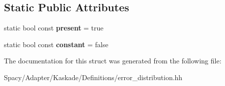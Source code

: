 \subsection*{Static Public Attributes}
\begin{DoxyCompactItemize}
\item 
\hypertarget{structSpacy_1_1Kaskade_1_1ErrorDistribution_1_1D1_ae12f3e44e152e93d2855a893a436472f}{}static bool const {\bfseries present} = true\label{structSpacy_1_1Kaskade_1_1ErrorDistribution_1_1D1_ae12f3e44e152e93d2855a893a436472f}

\item 
\hypertarget{structSpacy_1_1Kaskade_1_1ErrorDistribution_1_1D1_aebe5d1ff61fe5bd5274fd440ebeccfb5}{}static bool const {\bfseries constant} = false\label{structSpacy_1_1Kaskade_1_1ErrorDistribution_1_1D1_aebe5d1ff61fe5bd5274fd440ebeccfb5}

\end{DoxyCompactItemize}


The documentation for this struct was generated from the following file\+:\begin{DoxyCompactItemize}
\item 
Spacy/\+Adapter/\+Kaskade/\+Definitions/error\+\_\+distribution.\+hh\end{DoxyCompactItemize}
